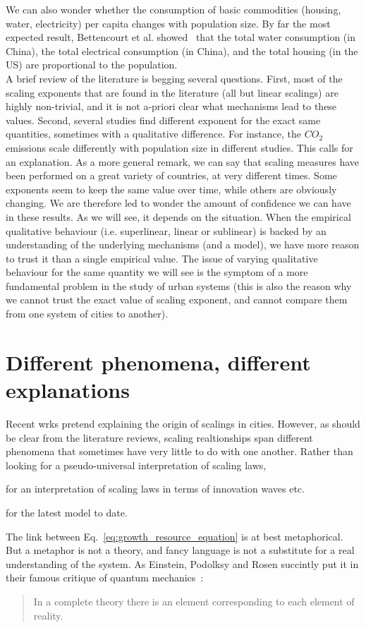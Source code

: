We can also wonder whether the consumption of basic commodities (housing, water,
electricity) per capita changes with population size. By far the most expected
result, Bettencourt et al. showed~\cite{Bettencourt:2007} that the total water
consumption (in China), the total electrical
consumption (in China),  and the total housing (in the US) are proportional to
the population.\\


A brief review of the literature is begging several questions. First, most of
the scaling exponents that are found in the literature (all but linear scalings)
are highly non-trivial, and it is not a-priori clear what mechanisms lead to
these values. Second, several studies find different exponent for the exact same
quantities, sometimes with a qualitative difference. For instance, the $CO_2$
emissions scale differently with population size in different studies. This
calls for an explanation.  As a more general remark, we can say that scaling
measures have been performed on a great variety of countries, at very different
times. Some exponents seem to keep the same value over time, while others are
obviously changing. We are therefore led to wonder the amount of confidence we
can have in these results.  As we will see, it depends on the situation. When
the empirical qualitative behaviour (i.e. superlinear, linear or sublinear) is
backed by an understanding of the underlying mechanisms (and a model), we have
more reason to trust it than a single empirical value. The issue of varying
qualitative behaviour for the same quantity we will see is the symptom of a
more fundamental problem in the study of urban systems (this is also the reason
why we cannot trust the exact value of scaling exponent, and cannot compare them
from one system of cities to another).



\section{Different phenomena, different explanations}
\label{sec:different_phenomena_different_explanations}
    
Recent wrks pretend explaining the origin of scalings in cities. However,
as should be clear from the literature reviews, scaling realtionships span
different phenomena that sometimes have very little to do with one another.
Rather than looking for a pseudo-universal interpretation of scaling laws, 

\cite{Pumain:2006} for an interpretation of scaling laws in terms of
innovation waves etc.

\cite{Bettencourt:2013} for the latest model to date.

The link between Eq.~\ref{eq:growth_resource_equation} is at best metaphorical.
But a metaphor is not a theory, and fancy language is not a substitute for a
real understanding of the system. As Einstein, Podolksy and Rosen succintly put
it in their famous critique of quantum mechanics~\cite{Einstein:1935}:

\begin{quote}
    In a complete theory there is an element corresponding to each element of
    reality.
\end{quote}

